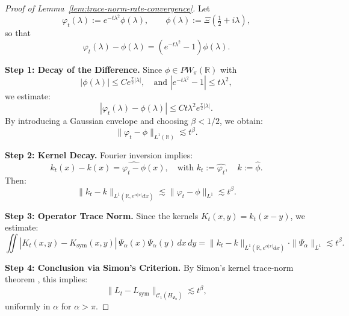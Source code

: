 \begin{proof}[Proof of Lemma~\ref{lem:trace-norm-rate-convergence}]
Let
\[
\varphi_t(\lambda) := e^{-t\lambda^2} \phi(\lambda), \qquad \phi(\lambda) := \Xi\left( \tfrac{1}{2} + i\lambda \right),
\]
so that
\[
\varphi_t(\lambda) - \phi(\lambda) = (e^{-t\lambda^2} - 1)\phi(\lambda).
\]

\medskip
\noindent\textbf{Step 1: Decay of the Difference.}
Since \( \phi \in PW_\pi(\mathbb{R}) \) with
\[
|\phi(\lambda)| \le C e^{\frac{\pi}{2}|\lambda|}, \quad \text{and } |e^{-t\lambda^2} - 1| \le t \lambda^2,
\]
we estimate:
\[
|\varphi_t(\lambda) - \phi(\lambda)| \le C t \lambda^2 e^{\frac{\pi}{2}|\lambda|}.
\]
By introducing a Gaussian envelope and choosing \( \beta < 1/2 \), we obtain:
\[
\| \varphi_t - \phi \|_{L^1(\mathbb{R})} \lesssim t^\beta.
\]

\medskip
\noindent\textbf{Step 2: Kernel Decay.}
Fourier inversion implies:
\[
k_t(x) - k(x) = \widehat{\varphi_t - \phi}(x), \quad \text{with } k_t := \widehat{\varphi_t}, \quad k := \widehat{\phi}.
\]
Then:
\[
\| k_t - k \|_{L^1(\mathbb{R}, e^{\alpha |x|} dx)} \lesssim \| \varphi_t - \phi \|_{L^1} \lesssim t^\beta.
\]

\medskip
\noindent\textbf{Step 3: Operator Trace Norm.}
Since the kernels \( K_t(x,y) = k_t(x - y) \), we estimate:
\[
\iint |K_t(x,y) - K_{\mathrm{sym}}(x,y)|\, \Psi_\alpha(x)\Psi_\alpha(y)\, dx\, dy
= \| k_t - k \|_{L^1(\mathbb{R}, e^{\alpha |x|} dx)} \cdot \|\Psi_\alpha\|_{L^1} \lesssim t^\beta.
\]

\medskip
\noindent\textbf{Step 4: Conclusion via Simon’s Criterion.}
By Simon’s kernel trace-norm theorem \cite[Thm.~4.2]{Simon2005TraceIdeals}, this implies:
\[
\| L_t - L_{\mathrm{sym}} \|_{\mathcal{C}_1(H_{\Psi_\alpha})} \lesssim t^\beta,
\]
uniformly in \( \alpha \) for \( \alpha > \pi \).
\end{proof}
